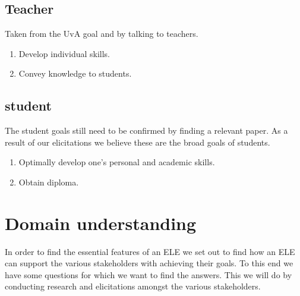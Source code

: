 \section{Teacher}
Taken from the UvA goal and by talking to teachers.
\begin{enumerate}
	\item Develop individual skills.
	\item Convey knowledge to students.
\end{enumerate}

\section{student}
The student goals still need to be confirmed by finding a relevant paper. As a result of our elicitations we believe these are the broad goals of students.
\begin{enumerate}
	\item Optimally develop one's personal and academic skills.	
	\item Obtain diploma.
\end{enumerate}

\chapter{Domain understanding}
\label{ch:understanding} 
In order to find the essential features of an ELE we set out to find how an ELE can support the various stakeholders with achieving their goals. To this end we have some questions for which we want to find the answers. This we will do by conducting research and elicitations amongst the various stakeholders.

